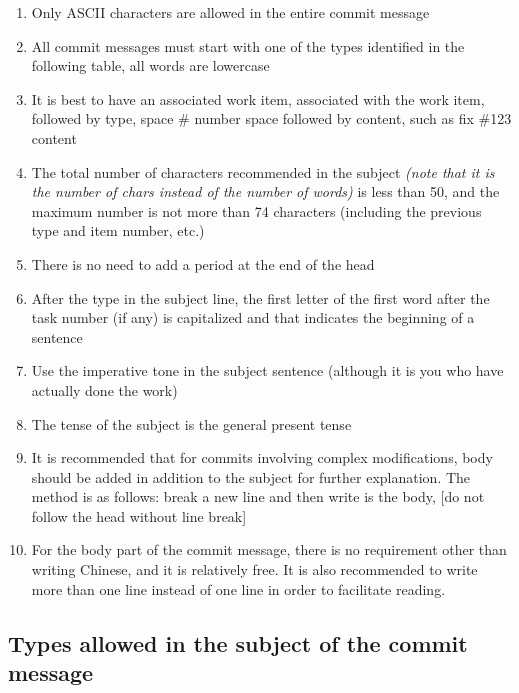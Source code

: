 \documentclass[a4paper]{report}
\begin{document}
\begin{enumerate}
\item
Only ASCII characters are allowed in the entire commit message
\item
All commit messages must start with one of the types identified in the following table, all words are lowercase
\item
It is best to have an associated work item, associated with the work item, followed by type, space \# number space followed by content, such as fix \#123 content
\item
The total number of characters recommended in the subject \emph{(note that it is the number of chars instead of the number of words)} is less than 50, and the maximum number is not more than 74 characters (including the previous type and item number, etc.)
\item
There is no need to add a period at the end of the head
\item 
After the type in the subject line, the first letter of the first word after the task number (if any) is capitalized and that indicates the beginning of a sentence
\item
Use the imperative tone in the subject sentence (although it is you who have actually done the work)
\item
The tense of the subject is the general present tense
\item
It is recommended that for commits involving complex modifications, body should be added in addition to the subject for further explanation. The method is as follows: break a new line and then write is the body, [do not follow the head without line break]
\item
For the body part of the commit message, there is no requirement other than writing Chinese, and it is relatively free. It is also recommended to write more than one line instead of one line in order to facilitate reading.
\end{enumerate}

\subsection{Types allowed in the subject of the commit message}
\end{document}
